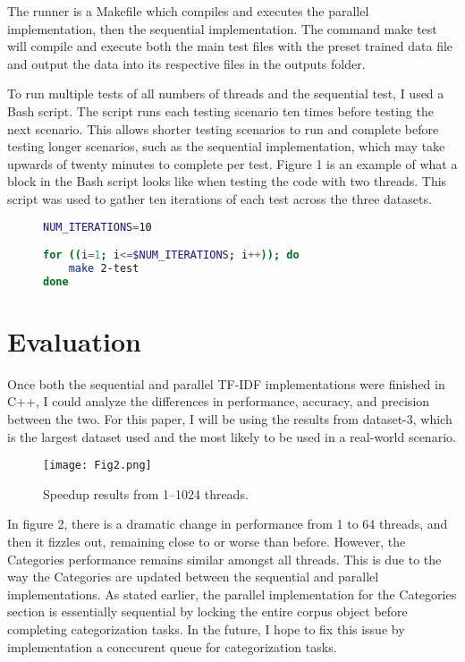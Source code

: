 \documentclass[conference]{IEEEtran}
\begin{document}
The runner is a Makefile which compiles and executes the parallel implementation, then the sequential implementation. The command make test will compile and execute both the main test files with the preset trained data file and output the data into its respective files in the outputs folder.

To run multiple tests of all numbers of threads and the sequential test, I used a Bash script. The script runs each testing scenario ten times before testing the next scenario. This allows shorter testing scenarios to run and complete before testing longer scenarios, such as the sequential implementation, which may take upwards of twenty minutes to complete per test. Figure 1 is an example of what a block in the Bash script looks like when testing the code with two threads. This script was used to gather ten iterations of each test across the three datasets.

\begin{figure}[htbp]
\centering    
\begin{minipage}{0.95\linewidth}
\begin{lstlisting}[style=ieeecpp, language=bash]
NUM_ITERATIONS=10

for ((i=1; i<=$NUM_ITERATIONS; i++)); do
    make 2-test
done
\end{lstlisting}
\end{minipage}
\end{figure}

\section{Evaluation} \label{sec:evaluation}
Once both the sequential and parallel TF-IDF implementations were finished in C++, I could analyze the differences in performance, accuracy, and precision between the two. For this paper, I will be using the results from dataset-3, which is the largest dataset used and the most likely to be used in a real-world scenario.

\begin{figure}[htbp]
\centerline{\texttt{[image: Fig2.png]}}
\caption{Speedup results from 1--1024 threads.}
\label{fig}
\end{figure}

In figure 2, there is a dramatic change in performance from 1 to 64 threads, and then it fizzles out, remaining close to or worse than before. However, the Categories performance remains similar amongst all threads. This is due to the way the Categories are updated between the sequential and parallel implementations. As stated earlier, the parallel implementation for the Categories section is essentially sequential by locking the entire corpus object before completing categorization tasks. In the future, I hope to fix this issue by implementation a conccurent queue for categorization tasks.
\end{document}
